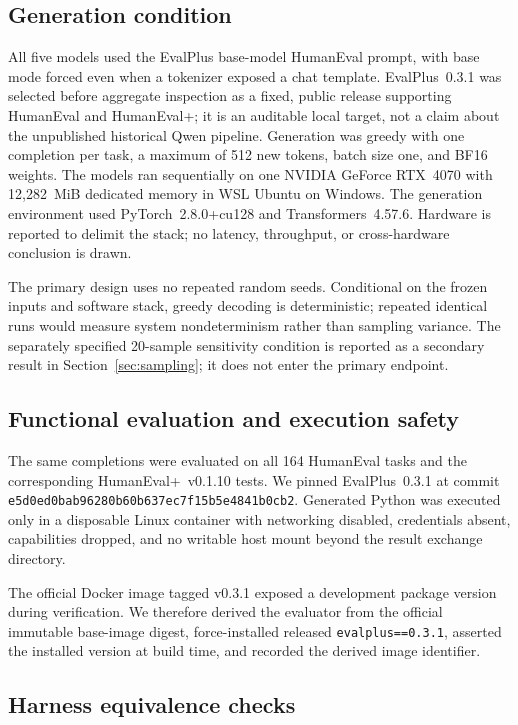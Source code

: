 \documentclass[10pt,twocolumn]{article}
\newcommand{\code}[1]{\texttt{#1}}
\begin{document}
\subsection{Generation condition}

All five models used the EvalPlus base-model HumanEval prompt, with base mode forced even when a tokenizer exposed a chat template. EvalPlus~0.3.1 was selected before aggregate inspection as a fixed, public release supporting HumanEval and HumanEval+; it is an auditable local target, not a claim about the unpublished historical Qwen pipeline. Generation was greedy with one completion per task, a maximum of 512 new tokens, batch size one, and BF16 weights. The models ran sequentially on one NVIDIA GeForce RTX~4070 with 12,282~MiB dedicated memory in WSL Ubuntu on Windows. The generation environment used PyTorch~2.8.0+cu128 and Transformers~4.57.6. Hardware is reported to delimit the stack; no latency, throughput, or cross-hardware conclusion is drawn.

The primary design uses no repeated random seeds. Conditional on the frozen inputs and software stack, greedy decoding is deterministic; repeated identical runs would measure system nondeterminism rather than sampling variance. The separately specified 20-sample sensitivity condition is reported as a secondary result in Section~\ref{sec:sampling}; it does not enter the primary endpoint.

\subsection{Functional evaluation and execution safety}

The same completions were evaluated on all 164 HumanEval tasks and the corresponding HumanEval+~v0.1.10 tests. We pinned EvalPlus~0.3.1 at commit \code{e5d0ed0bab96280b60b637ec7f15b5e4841b0cb2}. Generated Python was executed only in a disposable Linux container with networking disabled, credentials absent, capabilities dropped, and no writable host mount beyond the result exchange directory.

The official Docker image tagged v0.3.1 exposed a development package version during verification. We therefore derived the evaluator from the official immutable base-image digest, force-installed released \code{evalplus==0.3.1}, asserted the installed version at build time, and recorded the derived image identifier.

\subsection{Harness equivalence checks}
\end{document}
